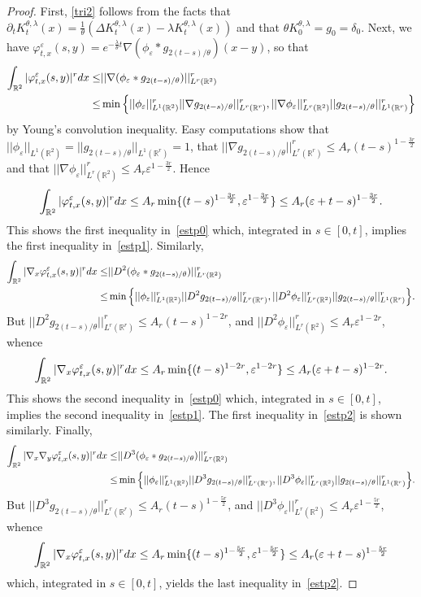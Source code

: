 \documentclass[10pt,a4paper]{amsart}
\newcommand{\R}{\mathbb{R}}
\newcommand{\dd}{{\rm d}}
\newcommand{\e}{\varepsilon}
\begin{document}
\begin{proof}
First, \eqref{tri2} follows from the facts that 
$\partial_t K^{\theta,\lambda}_t(x)=\frac1\theta(\Delta K^{\theta,\lambda}_t(x)-\lambda K^{\theta,\lambda}_t(x))$ and that
$\theta K^{\theta,\lambda}_0=g_0=\delta_0$.
Next, we have $\varphi^\e_{t,x}(s,y)=e^{-\frac \lambda\theta t} \nabla(\phi_\e\ast g_{2(t-s)/\theta})(x-y)$, so that
\begin{align*}
\int_{\R^2} |\varphi^\e_{t,x}(s,y)|^r \dd x \leq& ||\nabla(\phi_\e\ast g_{2(t-s)/\theta})||_{L^r(\R^2)}^r \\
\leq& \min\Big\{||\phi_\e||_{L^1(\R^2)}^r||\nabla g_{2(t-s)/\theta}||_{L^r(\R^r)}^r,
||\nabla \phi_\e||_{L^r(\R^2)}^r||g_{2(t-s)/\theta}||_{L^1(\R^r)}^r \Big\}
\end{align*}
by Young's convolution inequality. Easy computations show that $||\phi_\e||_{L^1(\R^2)}=
||g_{2(t-s)/\theta}||_{L^1(\R^r)}=1$, that $||\nabla g_{2(t-s)/\theta}||_{L^r(\R^r)}^r\leq A_r (t-s)^{1-\frac{3r}2}$
and that $||\nabla \phi_\e||_{L^r(\R^2)}^r \leq A_r \e^{1-\frac{3r}2}$. Hence
\begin{align*}
\int_{\R^2} |\varphi^\e_{t,x}(s,y)|^r \dd x \leq A_r \min\{(t-s)^{1-\frac{3r}2},\e^{1-\frac{3r}2}\}\leq 
A_r(\e+t-s)^{1-\frac{3r}2}.
\end{align*}
This shows the first inequality in~\eqref{estp0} which, integrated in $s\in [0,t]$, implies the first inequality 
in~\eqref{estp1}. Similarly,
\begin{align*}
\int_{\R^2} |\nabla_x\varphi^\e_{t,x}(s,y)|^r \dd x \leq& ||D^2(\phi_\e\ast g_{2(t-s)/\theta})||_{L^r(\R^2)}^r \\
\leq& \min\Big\{||\phi_\e||_{L^1(\R^2)}^r||D^2 g_{2(t-s)/\theta}||_{L^r(\R^r)}^r,
||D^2\phi_\e||_{L^r(\R^2)}^r||g_{2(t-s)/\theta}||_{L^1(\R^r)}^r \Big\}.
\end{align*}
But $||D^2 g_{2(t-s)/\theta}||_{L^r(\R^r)}^r\leq A_r (t-s)^{1-2r}$,
and $||D^2\phi_\e||_{L^r(\R^2)}^r \leq A_r \e^{1-2r}$, whence
\begin{align*}
\int_{\R^2} |\nabla_x\varphi^\e_{t,x}(s,y)|^r \dd x \leq A_r \min\{(t-s)^{1-2r},\e^{1-2r}\}\leq 
A_r(\e+t-s)^{1-2r}.
\end{align*}
This shows the second inequality in~\eqref{estp0} which, integrated in $s\in [0,t]$, implies the second inequality 
in~\eqref{estp1}. The first inequality in~\eqref{estp2} is shown similarly. Finally,
\begin{align*}
\int_{\R^2} |\nabla_x \nabla_y\varphi^\e_{t,x}(s,y)|^r \dd x \leq& ||D^3(\phi_\e\ast g_{2(t-s)/\theta})||_{L^r(\R^2)}^r \\
\leq& \min\Big\{||\phi_\e||_{L^1(\R^2)}^r||D^3 g_{2(t-s)/\theta}||_{L^r(\R^r)}^r,
||D^3\phi_\e||_{L^r(\R^2)}^r||g_{2(t-s)/\theta}||_{L^1(\R^r)}^r \Big\}.
\end{align*}
But $||D^3 g_{2(t-s)/\theta}||_{L^r(\R^r)}^r\leq A_r (t-s)^{1-\frac{5r}2}$,
and $||D^3\phi_\e||_{L^r(\R^2)}^r \leq A_r \e^{1-\frac{5r}2}$, whence
\begin{align*}
\int_{\R^2} |\nabla_x\varphi^\e_{t,x}(s,y)|^r \dd x \leq A_r \min\{(t-s)^{1-\frac{5r}2},\e^{1-\frac{5r}2}\}\leq 
A_r(\e+t-s)^{1-\frac{5r}2}
\end{align*}
which, integrated in $s\in [0,t]$, yields the last inequality in~\eqref{estp2}.
\end{proof} 
\end{document}
